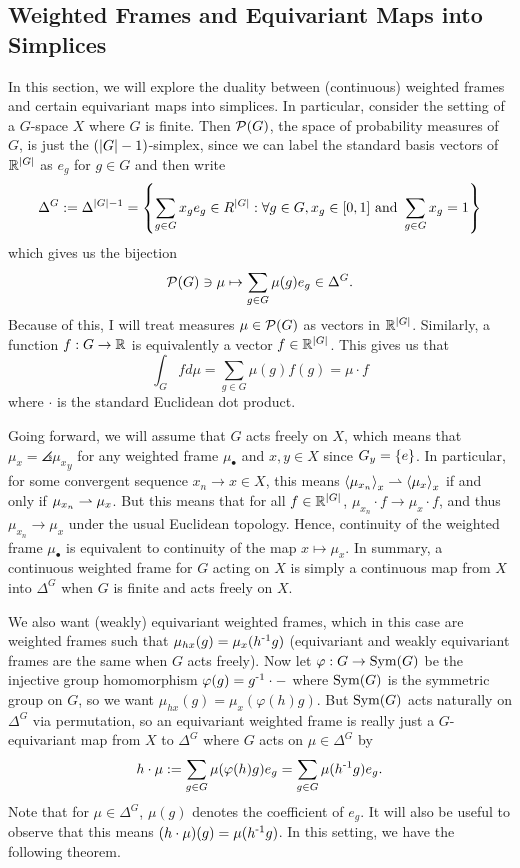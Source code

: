 \subsection{Weighted Frames and Equivariant Maps into Simplices}\label{sec:frame-simplex-duality}

In this section, we will explore the duality between (continuous) weighted frames and certain equivariant maps into simplices.
In particular, consider the setting of a $G$-space $X$ where $G$ is finite.
Then $\mathcal{P}(G)$, the space of probability measures of $G$, is just the $(\left| G \right|-1)$-simplex, since we can label the standard basis vectors of $\mathbb{R}^{\left| G \right|}$ as $e_g$ for $g \in G$ and then write
\[
    \Delta^G := \Delta^{\left| G \right| - 1} = \left\{ \sum_{g \in G} x_g e_g \in R^{\left| G \right|} : \forall g \in G, x_g \in [0,1] \text{ and } \sum_{g \in G} x_g = 1 \right\}
\]
which gives us the bijection
\[
    \mathcal{P}(G) \ni \mu \mapsto \sum_{g \in G} \mu(g) e_g \in \Delta^G.
\]
Because of this, I will treat measures $\mu \in \mathcal{P}(G)$ as vectors in $\mathbb{R}^{\left| G \right|}$.
Similarly, a function $f : G \to \mathbb{R}$ is equivalently a vector $f \in \mathbb{R}^{\left| G \right|}$.
This gives us that
\[
    \int_G f d \mu
    = \sum_{g \in G} \mu(g) f(g)
    = \mu \cdot f
\]
where $\cdot$ is the standard Euclidean dot product.

Going forward, we will assume that $G$ acts freely on $X$, which means that $\mu_x = \angles{\mu_x}_y$ for any weighted frame $\mu_\bullet$ and $x,y \in X$ since $G_y = \left\{ e \right\}$.
In particular, for some convergent sequence $x_n \to x \in X$, this means $\left\langle \mu_{x_n} \right\rangle_x \rightharpoonup \left\langle \mu_x \right\rangle_x$ if and only if $\mu_{x_n} \rightharpoonup \mu_x$.
But this means that for all $f \in \mathbb{R}^{\left| G \right|}$, $\mu_{x_n} \cdot f \to \mu_x \cdot f$, and thus $\mu_{x_n} \to \mu_x$ under the usual Euclidean topology.
Hence, continuity of the weighted frame $\mu_\bullet$ is equivalent to continuity of the map $x \mapsto \mu_x$.
In summary, a continuous weighted frame for $G$ acting on $X$ is simply a continuous map from $X$ into $\Delta^G$ when $G$ is finite and acts freely on $X$.

We also want (weakly) equivariant weighted frames, which in this case are weighted frames such that $\mu_{hx} (g) = \mu_x (h^{\text{-}1} g)$ (equivariant and weakly equivariant frames are the same when $G$ acts freely).
Now let $\varphi : G \to \operatorname{Sym}(G)$ be the injective group homomorphism $\varphi(g) = g^{\text{-}1} \cdot -$ where $\operatorname{Sym}(G)$ is the symmetric group on $G$, so we want $\mu_{hx}(g) = \mu_x (\varphi(h) g)$.
But $\operatorname{Sym}(G)$ acts naturally on $\Delta^G$ via permutation, so an equivariant weighted frame is really just a $G$-equivariant map from $X$ to $\Delta^G$ where $G$ acts on $\mu \in \Delta^G$ by
\[
    h \cdot \mu
    := \sum_{g \in G} \mu(\varphi(h) g) e_g
    = \sum_{g \in G} \mu(h^{\text{-}1} g) e_g.
\]
Note that for $\mu \in \Delta^G$, $\mu(g)$ denotes the coefficient of $e_g$.
It will also be useful to observe that this means $(h \cdot \mu)(g) = \mu(h^{\text{-}1} g)$.
In this setting, we have the following theorem.


